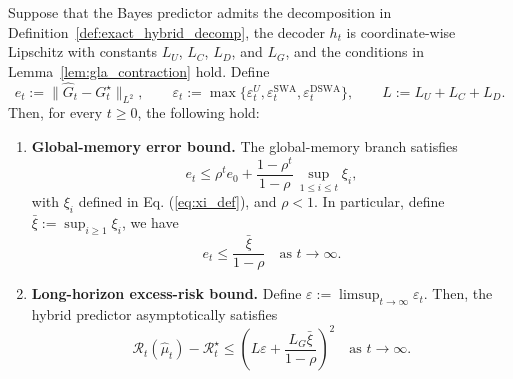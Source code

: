\begin{theorem}
\label{thm:kairos_sufficiency}
Suppose that the Bayes predictor admits the decomposition in Definition~\ref{def:exact_hybrid_decomp}, the decoder $h_t$ is coordinate-wise Lipschitz with constants $L_U$, $L_C$, $L_D$, and $L_G$, and the conditions in Lemma~\ref{lem:gla_contraction} hold. Define
\begin{equation}
e_t := \|\hat G_t-G_t^\star\|_{L^2}, \qquad
\varepsilon_t := \max\!\bigl\{\varepsilon_t^U,\varepsilon_t^{\mathrm{SWA}},\varepsilon_t^{\mathrm{DSWA}}\bigr\},
\qquad
L := L_U+L_C+L_D .
\label{eq:et_eps_def}
\end{equation}
Then, for every $t\ge 0$, the following hold:
\begin{enumerate}
    \item[\textup{(i)}] \textbf{Global-memory error bound.}
   The global-memory branch satisfies
\begin{equation}
    e_t \le \rho^t e_0 + \frac{1-\rho^t}{1-\rho}\, \sup_{1\le i\le t}\xi_i,
    \label{eq:main_memory_bound}
\end{equation}
with $\xi_i$ defined in Eq. (\ref{eq:xi_def}), and $\rho<1$. 
In particular, define $\bar\xi :=  \sup_{i\ge 1}\xi_i$,  we have
\begin{equation}
    e_t \le \frac{\bar\xi}{1-\rho} \quad \text{as } t \to \infty.
    \label{eq:main_memory_limsup}
\end{equation}

   \item[\textup{(ii)}] \textbf{Long-horizon excess-risk bound.}
    Define $\varepsilon := \limsup_{t\to\infty} \varepsilon_t$. Then, the hybrid predictor asymptotically satisfies
    \begin{equation}
    \mathcal R_t(\hat\mu_t)-\mathcal R_t^\star 
    \le
    \left(
    L \varepsilon
    +
    \frac{L_G \bar\xi}{1-\rho}
    \right)^2 \quad \text{as } t \to \infty.
    \label{eq:main_risk_bound_infty}
    \end{equation}
\end{enumerate}
\end{theorem}

